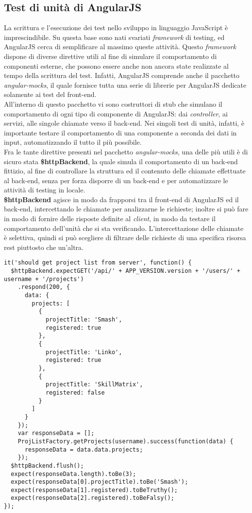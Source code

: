 \subsection{Test di unità di AngularJS}
La scrittura e l'esecuzione dei test nello sviluppo in linguaggio JavaScript è imprescindibile. Su questa base sono nati svariati \emph{framework} di testing, ed AngularJS cerca di semplificare al massimo queste attività. Questo \emph{framework} dispone di diverse direttive utili al fine di simulare il comportamento di componenti esterne, che possono essere anche non ancora state realizzate al tempo della scrittura del test. Infatti, AngularJS comprende anche il pacchetto \emph{angular-mocks}, il quale fornisce tutta una serie di librerie per AngularJS dedicate solamente ai test del \gls{front-end}.\\
All'interno di questo pacchetto vi sono costruttori di \gls{stub} che simulano il comportamento di ogni tipo di componente di AngularJS: dai \emph{controller}, ai servizi, alle singole chiamate verso il \gls{back-end}. Nei singoli test di unità, infatti, è importante testare il comportamento di una componente a seconda dei dati in input, automatizzando il tutto il più possibile.\\
Fra le tante direttive presenti nel pacchetto \emph{angular-mocks}, una delle più utili è di sicuro stata \textbf{\$httpBackend}, la quale simula il comportamento di un \gls{back-end} fittizio, al fine di controllare la struttura ed il contenuto delle chiamate effettuate al \gls{back-end}, senza per forza disporre di un \gls{back-end} e per automatizzare le attività di testing in locale.\\
\textbf{\$httpBackend} agisce in modo da frapporsi tra il \gls{front-end} di AngularJS ed il \gls{back-end}, intercettando le chiamate per analizzarne le richieste; inoltre si può fare in modo di fornire delle risposte definite al \emph{client}, in modo da testare il comportamento dell'unità che si sta verificando. L'intercettazione delle chiamate è selettiva, quindi si può scegliere di filtrare delle richieste di una specifica risorsa \gls{rest} piuttosto che un'altra.
\begin{verbatim}
it('should get project list from server', function() {
  $httpBackend.expectGET('/api/' + APP_VERSION.version + '/users/' + username + '/projects')
    .respond(200, {
      data: {
        projects: [
          {
            projectTitle: 'Smash',
            registered: true
          },
          {
            projectTitle: 'Linko',
            registered: true
          },
          {
            projectTitle: 'SkillMatrix',
            registered: false
          }
        ]
      }
    });
    var responseData = [];
    ProjListFactory.getProjects(username).success(function(data) {
      responseData = data.data.projects;
    });
  $httpBackend.flush();
  expect(responseData.length).toBe(3);
  expect(responseData[0].projectTitle).toBe('Smash');
  expect(responseData[1].registered).toBeTruthy();
  expect(responseData[2].registered).toBeFalsy();
});
\end{verbatim}
